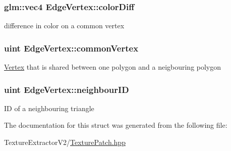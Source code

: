 \subsubsection[{color\+Diff}]{\setlength{\rightskip}{0pt plus 5cm}glm\+::vec4 Edge\+Vertex\+::color\+Diff}\label{struct_edge_vertex_a7c1790b8527e54c9eca13038c5351032}
difference in color on a common vertex \hypertarget{struct_edge_vertex_a8439c6928189921562f355db598fcf01}{}
\subsubsection[{common\+Vertex}]{\setlength{\rightskip}{0pt plus 5cm}uint Edge\+Vertex\+::common\+Vertex}\label{struct_edge_vertex_a8439c6928189921562f355db598fcf01}
\hyperlink{struct_vertex}{Vertex} that is shared between one polygon and a neigbouring polygon \hypertarget{struct_edge_vertex_a0383800c9299c747dc5ddbf4b397806d}{}
\subsubsection[{neighbour\+I\+D}]{\setlength{\rightskip}{0pt plus 5cm}uint Edge\+Vertex\+::neighbour\+I\+D}\label{struct_edge_vertex_a0383800c9299c747dc5ddbf4b397806d}
I\+D of a neighbouring triangle 

The documentation for this struct was generated from the following file\+:\begin{DoxyCompactItemize}
\item 
Texture\+Extractor\+V2/\hyperlink{_texture_patch_8hpp}{Texture\+Patch.\+hpp}\end{DoxyCompactItemize}
